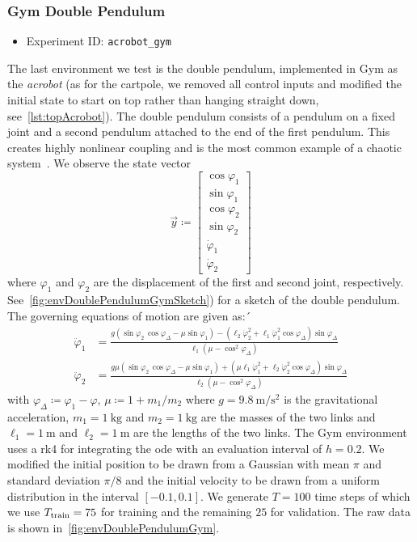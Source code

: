 		\subsubsection{Gym Double Pendulum}
			\begin{itemize}
				\item Experiment ID: \texttt{acrobot\_gym}
			\end{itemize}

			The last environment we test is the double pendulum, implemented in Gym as the \emph{acrobot} (as for the cartpole, we removed all control inputs and modified the initial state to start on top rather than hanging straight down, see~\autoref{lst:topAcrobot}). The double pendulum consists of a pendulum on a fixed joint and a second pendulum attached to the end of the first pendulum. This creates highly nonlinear coupling and is the most common example of a chaotic system~\cite{shinbrotChaosDoublePendulum1992}. We observe the state vector
			\begin{equation*}
				\vec{y} \coloneqq
					\begin{bmatrix}
						\cos\varphi_1 \\
						\sin\varphi_1 \\
						\cos\varphi_2 \\
						\sin\varphi_2 \\
						\dot{\varphi}_1 \\
						\dot{\varphi}_2
					\end{bmatrix}
			\end{equation*}
			where \(\varphi_1\) and \(\varphi_2\) are the displacement of the first and second joint, respectively. See~\autoref{fig:envDoublePendulumGymSketch}) for a sketch of the double pendulum. The governing equations of motion are given as:´
			\begin{align*}
				\ddot{\varphi}_1 &= \frac{g (\sin\varphi_2 \, \cos\varphi_\Delta - \mu \sin\varphi_1) - (\ell_2 \dot{\varphi}_2^2 + \ell_1 \dot{\varphi}_1^2 \cos\varphi_\Delta) \sin\varphi_\Delta}{\ell_1 (\mu - \cos^2\varphi_\Delta)} \\
				\ddot{\varphi}_2 &= \frac{g \mu (\sin\varphi_2 \, \cos\varphi_\Delta - \mu \sin\varphi_1) + (\mu \ell_1 \dot{\varphi}_1^2 + \ell_2 \dot{\varphi}_2^2 \cos\varphi_\Delta) \sin\varphi_\Delta}{\ell_2 (\mu - \cos^2\varphi_\Delta)}
			\end{align*}
			with \( \varphi_\Delta \coloneqq \varphi_1 - \varphi \), \( \mu \coloneqq 1 + m_1/m_2 \) where \( g = \SI{9.8}{\meter\per\second\squared} \) is the gravitational acceleration, \( m_1 = \SI{1}{\kilogram} \) and \( m_2 = \SI{1}{\kilogram} \) are the masses of the two links and \( \ell_1 = \SI{1}{\meter} \) and \( \ell_2 = \SI{1}{\meter} \) are the lengths of the two links. The Gym environment uses a \ac{rk4} for integrating the \ac{ode} with an evaluation interval of \( h = 0.2 \). We modified the initial position to be drawn from a Gaussian with mean \( \pi \) and standard deviation \( \pi/8 \) and the initial velocity to be drawn from a uniform distribution in the interval \( [-0.1, 0.1] \). We generate \( T = 100 \) time steps of which we use \( T_{\mathrm{train}} = 75 \) for training and the remaining \(25\) for validation. The raw data is shown in~\autoref{fig:envDoublePendulumGym}.

